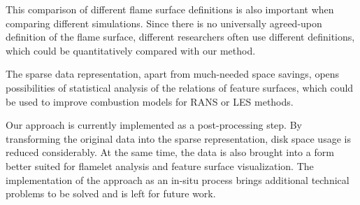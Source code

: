 %
This comparison of different flame surface definitions is also important when
comparing different simulations.
%
Since there is no universally agreed-upon definition of the flame surface,
different researchers often use different definitions, which could be
quantitatively compared with our method.
%

%
The sparse data representation, apart from much-needed space savings, opens
possibilities of statistical analysis of the relations of feature surfaces,
which could be used to improve combustion models for \ac{RANS} or \ac{LES}
methods.
%

%
Our approach is currently implemented as a post-processing step. By transforming
the original data into the sparse representation, disk space usage is reduced
considerably.
%
At the same time, the data is also brought into a form better suited for
flamelet analysis and feature surface visualization.
%
The implementation of the approach as an in-situ process brings additional
technical problems to be solved and is left for future work.
%


%
